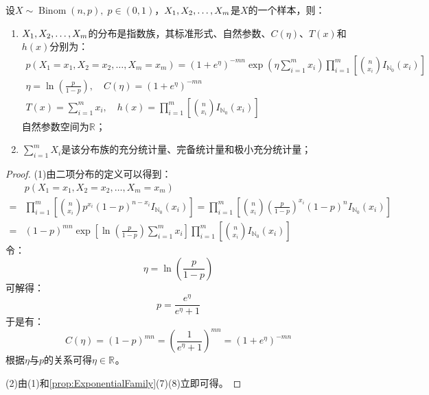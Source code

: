\begin{theorem}
	设$X\sim\operatorname{Binom}(n,p),\;p\in(0,1)$，$X_1, X_2, \dots, X_{m}$是$X$的一个样本，则：
	\begin{enumerate}
		\item $X_1, X_2, \dots, X_{m}$的分布是指数族，其标准形式、自然参数、$C(\eta)$、$T(x)$和$h(x)$分别为：
		\begin{gather*}
			p(X_1=x_1,X_2=x_2,\dots,X_m=x_m)=(1+e^{\eta})^{-mn}\exp\left(\eta\sum_{i=1}^{m}x_i\right)\prod_{i=1}^{m}\left[\binom{n}{x_i}I_{\mathbb{N}_0}(x_i)\right] \\
			\eta=\ln\left(\frac{p}{1-p}\right),\quad C(\eta)=(1+e^{\eta})^{-mn} \\ T(x)=\sum_{i=1}^{m}x_i,\quad h(x)=\prod_{i=1}^{m}\left[\binom{n}{x_i}I_{\mathbb{N}_0}(x_i)\right]
		\end{gather*}
		自然参数空间为$\mathbb{R}^{}$；
		\item $\sum\limits_{i=1}^{m}X_i$是该分布族的充分统计量、完备统计量和极小充分统计量；
	\end{enumerate}
\end{theorem}
\begin{proof}
	(1)由二项分布的定义可以得到：
	\begin{align*}
		&p(X_1=x_1,X_2=x_2,\dots,X_m=x_m) \\
		=&\prod_{i=1}^{m}\left[\binom{n}{x_i}p^{x_i}(1-p)^{n-x_i}I_{\mathbb{N}_0}(x_i)\right]=\prod_{i=1}^{m}\left[\binom{n}{x_i}\left(\frac{p}{1-p}\right)^{x_i}(1-p)^nI_{\mathbb{N}_0}(x_i)\right] \\
		=&(1-p)^{mn}\exp\left[\ln\left(\frac{p}{1-p}\right)\sum_{i=1}^{m}x_i\right]\prod_{i=1}^{m}\left[\binom{n}{x_i}I_{\mathbb{N}_0}(x_i)\right]
	\end{align*}
	令：
	\begin{equation*}
		\eta=\ln\left(\frac{p}{1-p}\right)
	\end{equation*}
	可解得：
	\begin{equation*}
		p=\frac{e^{\eta}}{e^{\eta}+1}
	\end{equation*}
	于是有：
	\begin{equation*}
		C(\eta)=(1-p)^{mn}=\left(\frac{1}{e^{\eta}+1}\right)^{mn}=(1+e^{\eta})^{-mn}
	\end{equation*}
	根据$\eta$与$p$的关系可得$\eta\in\mathbb{R}^{}$。\par
	(2)由(1)和\cref{prop:ExponentialFamily}(7)(8)立即可得。
\end{proof}

